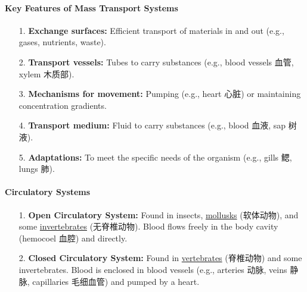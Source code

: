 \paragraph{Key Features of Mass Transport Systems}
\begin{itemize}
    \item[1.] \textbf{Exchange surfaces:} Efficient transport of materials in and out (e.g., gases, nutrients, waste).
    \item[2.] \textbf{Transport vessels:} Tubes to carry substances (e.g., blood vessels 血管, xylem 木质部).
    \item[3.] \textbf{Mechanisms for movement:} Pumping (e.g., heart 心脏) or maintaining concentration gradients.
    \item[4.] \textbf{Transport medium:} Fluid to carry substances (e.g., blood 血液, sap 树液).
    \item[5.] \textbf{Adaptations:} To meet the specific needs of the organism (e.g., gills 鳃, lungs 肺).
\end{itemize}

\paragraph{Circulatory Systems}
\begin{itemize}
    \item[1.] \textbf{Open Circulatory System:} Found in insects, \underline{mollusks} (软体动物), and some
    \underline{invertebrates} (无脊椎动物). Blood flows freely in the body cavity (hemocoel 血腔) and directly.
    \item[2.] \textbf{Closed Circulatory System:} Found in \underline{vertebrates} (脊椎动物) and some invertebrates. Blood is
    enclosed in blood vessels (e.g., arteries 动脉, veins 静脉, capillaries 毛细血管) and pumped by a heart.
\end{itemize}

